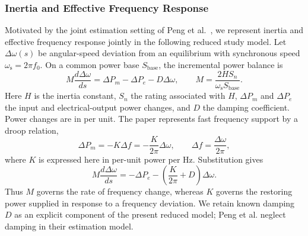 \documentclass[journal]{IEEEtran}
\begin{document}
\subsubsection{Inertia and Effective Frequency Response}
Motivated by the joint estimation setting of Peng et al.~\cite{peng2024probing},
we represent inertia and effective frequency response jointly in the following
reduced study model. Let $\Delta\omega(s)$ be angular-speed deviation
from an equilibrium with synchronous speed $\omega_{\mathrm s}=2\pi f_0$.
On a common power base $S_{\mathrm{base}}$, the incremental power balance is
\begin{equation}
M\frac{d\Delta\omega}{ds}
=\Delta P_m-\Delta P_e-D\Delta\omega,
\qquad M=\frac{2HS_n}{\omega_{\mathrm s}S_{\mathrm{base}}}.
\label{eq:inertia-balance}
\end{equation}
Here $H$ is the inertia constant, $S_n$ the rating associated with $H$,
$\Delta P_m$ and $\Delta P_e$ the input and electrical-output power changes,
and $D$ the damping coefficient. Power changes are in per unit.
The paper represents fast frequency support by a droop relation,
\begin{equation}
\Delta P_m=-K\Delta f=-\frac{K}{2\pi}\Delta\omega,
\qquad \Delta f=\frac{\Delta\omega}{2\pi},
\label{eq:frequency-support}
\end{equation}
where $K$ is expressed here in per-unit power per Hz. Substitution gives
\begin{equation}
M\frac{d\Delta\omega}{ds}
=-\Delta P_e-\left(\frac{K}{2\pi}+D\right)\Delta\omega.
\label{eq:aggregate_model}
\end{equation}
Thus $M$ governs the rate of frequency change, whereas $K$ governs the
restoring power supplied in response to a frequency deviation. We retain
known damping $D$ as an explicit component of the present reduced model;
Peng et al. neglect damping in their estimation model.
\end{document}
